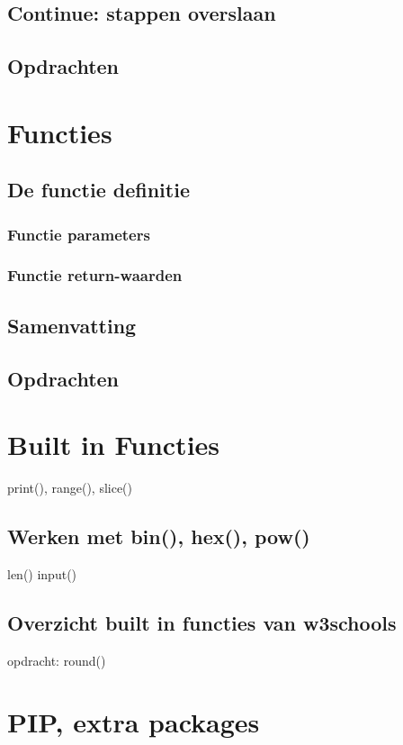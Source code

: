 \documentclass[a4paper,12pt,twoside,openright,titlepage]{book}
\begin{document}
\section{Continue: stappen overslaan}

\section{Opdrachten}


\chapter{Functies}

\section{De functie definitie}

\subsection{Functie parameters}

\subsection{Functie return-waarden}

\section{Samenvatting}

\section{Opdrachten}


\chapter{Built in Functies}
print(), range(), slice()
\section{Werken met bin(), hex(), pow()}
len()
input()
\section{Overzicht built in functies van w3schools}

opdracht: round()

\chapter{PIP, extra packages}
\end{document}
